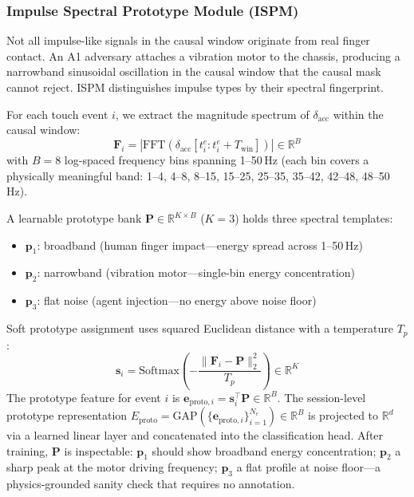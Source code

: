 \subsubsection{Impulse Spectral Prototype Module (ISPM)}
\label{sec:ispm}

Not all impulse-like signals in the causal window originate from real finger contact.%
An A1 adversary attaches a vibration motor to the chassis, producing a narrowband
sinusoidal oscillation in the causal window that the causal mask cannot reject.%
ISPM distinguishes impulse types by their spectral fingerprint.%

For each touch event $i$, we extract the magnitude spectrum of $\delta_{\mathrm{acc}}$
within the causal window:
\begin{equation}
\mathbf{F}_i = |\mathrm{FFT}(\delta_{\mathrm{acc}}[t_i^e : t_i^e + T_{\mathrm{win}}])| \in \mathbb{R}^{B}
\label{eq:fft}
\end{equation}
with $B{=}8$ log-spaced frequency bins spanning 1--50\,Hz (each bin covers a
physically meaningful band: 1--4, 4--8, 8--15, 15--25, 25--35, 35--42, 42--48, 48--50\,Hz).%

A learnable prototype bank $\mathbf{P} \in \mathbb{R}^{K \times B}$ ($K{=}3$) holds
three spectral templates:%
\begin{itemize}[leftmargin=*,topsep=2pt,itemsep=0pt]
  \item $\mathbf{p}_1$: broadband (human finger impact---energy spread across 1--50\,Hz)
  \item $\mathbf{p}_2$: narrowband (vibration motor---single-bin energy concentration)
  \item $\mathbf{p}_3$: flat noise (agent injection---no energy above noise floor)
\end{itemize}
Soft prototype assignment uses squared Euclidean distance with a temperature $T_p$:
\begin{equation}
\mathbf{s}_i = \mathrm{Softmax}\!\left(-\frac{\|\mathbf{F}_i - \mathbf{P}\|_2^2}{T_p}\right) \in \mathbb{R}^K
\label{eq:proto_assign}
\end{equation}
The prototype feature for event $i$ is $\mathbf{e}_{\mathrm{proto},i} = \mathbf{s}_i^\top \mathbf{P} \in \mathbb{R}^B$.%
The session-level prototype representation
$E_{\mathrm{proto}} = \mathrm{GAP}(\{\mathbf{e}_{\mathrm{proto},i}\}_{i=1}^{N_e}) \in \mathbb{R}^B$
is projected to $\mathbb{R}^d$ via a learned linear layer and concatenated into the
classification head.%
After training, $\mathbf{P}$ is inspectable: $\mathbf{p}_1$ should show broadband
energy concentration; $\mathbf{p}_2$ a sharp peak at the motor driving frequency;
$\mathbf{p}_3$ a flat profile at noise floor---a physics-grounded sanity check
that requires no annotation.%


